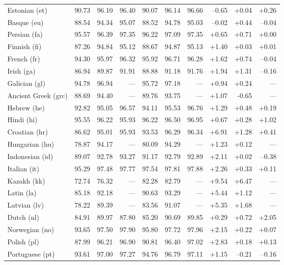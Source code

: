 \documentclass[11pt,letterpaper]{article}
\begin{document}
\begin{table}
\begin{tabular}{l|rrr|rrr|rrr}
Estonian (et) & 90.73 & 96.10 & 96.40 & 90.07 & 96.14 & 96.66 & --0.65 & +0.04 & +0.26\\
Basque (eu) & 88.54 & 94.34 & 95.07 & 88.52 & 94.78 & 95.03 & --0.02 & +0.44 & --0.04\\
Persian (fa) & 95.57 & 96.39 & 97.35 & 96.22 & 97.09 & 97.35 & +0.65 & +0.71 & +0.00\\
Finnish (fi) & 87.26 & 94.84 & 95.12 & 88.67 & 94.87 & 95.13 & +1.40 & +0.03 & +0.01\\
French (fr) & 94.30 & 95.97 & 96.32 & 95.92 & 96.71 & 96.28 & +1.62 & +0.74 & --0.04\\
Irish (ga) & 86.94 & 89.87 & 91.91 & 88.88 & 91.18 & 91.76 & +1.94 & +1.31 & --0.16\\
Galician (gl) & 94.78 & 96.94 & --- & 95.72 & 97.18 & --- & +0.94 & +0.24 & ---\\
Ancient Greek (grc) & 88.69 & 94.40 & --- & 89.76 & 93.75 & --- & +1.07 & -0.65 & ---\\
Hebrew (he) & 92.82 & 95.05 & 96.57 & 94.11 & 95.53 & 96.76 & +1.29 & +0.48 & +0.19\\
Hindi (hi) & 95.55 & 96.22 & 95.93 & 96.22 & 96.50 & 96.95 & +0.67 & +0.28 & +1.02\\
Croatian (hr) & 86.62 & 95.01 & 95.93 & 93.53 & 96.29 & 96.34 & +6.91 & +1.28 & +0.41\\
Hungarian (hu) & 78.87 & 94.17 & --- & 80.09 & 94.29 & --- & +1.23 & +0.12 & ---\\
Indonesian (id) & 89.07 & 92.78 & 93.27 & 91.17 & 92.79 & 92.89 & +2.11 & +0.02 & --0.38\\
Italian (it) & 95.29 & 97.48 & 97.77 & 97.54 & 97.81 & 97.88 & +2.26 & +0.33 & +0.11\\
Kazakh (kk) & 72.74 & 76.32 & --- & 82.28 & 82.79 & --- & +9.54 & +6.47 & ---\\
Latin (la) & 85.18 & 92.18 & --- & 90.63 & 93.29 & --- & +5.44 & +1.12 & ---\\
Latvian (lv) & 78.22 & 89.39 & --- & 83.56 & 91.07 & --- & +5.35 & +1.68 & ---\\
Dutch (nl) & 84.91 & 89.97 & 87.80 & 85.20 & 90.69 & 89.85 & +0.29 & +0.72 & +2.05\\
Norwegian (no) & 93.65 & 97.50 & 97.90 & 95.80 & 97.72 & 97.96 & +2.15 & +0.22 & +0.07\\
Polish (pl) & 87.99 & 96.21 & 96.90 & 90.81 & 96.40 & 97.02 & +2.83 & +0.18 & +0.13\\
Portuguese (pt) & 93.61 & 97.00 & 97.27 & 94.76 & 96.79 & 97.11 & +1.15 & --0.21 & --0.16\\

\end{tabular}
\end{table}
\end{document}
